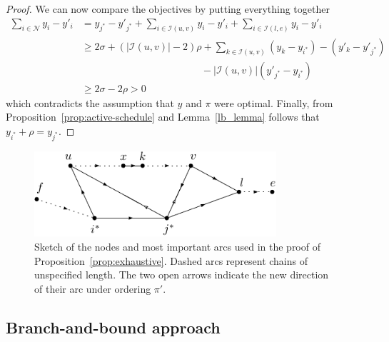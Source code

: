 \documentclass[a4paper]{article}
\theoremstyle{definition}
\theoremstyle{plain}
\begin{document}
\begin{proof}
  We can now compare the objectives by putting everything together
  \begin{align*}
    \sum_{i \in \mathcal{N}} y_{i} - y'_{i} &=  y_{j^{*}} - y'_{j^{*}} + \sum_{i \in \mathcal{I}(u, v)} y_{i} - y'_{i} + \sum_{i \in \mathcal{I}(l, e)} y_{i} - y'_{i} \\
    &\geq 2 \sigma + (|\mathcal{I}(u,v)| - 2) \rho + \sum_{k \in \mathcal{I}(u,v)} (y_{k} - y_{i^{*}}) - (y'_{k} - y'_{j^{*}}) \\ & \hspace{12em} - |\mathcal{I}(u,v)| (y'_{j^{*}} - y_{i^{*}}) \\
    &\geq 2 \sigma - 2 \rho > 0
  \end{align*}
  which contradicts the assumption that $y$ and $\pi$ were optimal.
  Finally, from Proposition~\ref{prop:active-schedule} and Lemma~\ref{lb_lemma}
  follows that $y_{i^{*}} + \rho = y_{j^{*}}$.
\end{proof}

\begin{figure}[H]
  \centering
  \includegraphics[width=0.8\textwidth]{figures/single/platoon-preservation-proof-diagram.pdf}
  \caption{Sketch of the nodes and most important arcs used in the proof of
    Proposition~\ref{prop:exhaustive}. Dashed arcs represent chains of
    unspecified length. The two open arrows indicate the new direction of their
    arc under ordering $\pi'$.}\label{fig:platoon-preservation-diagram}
\end{figure}


\subsection*{Branch-and-bound approach}
\end{document}
